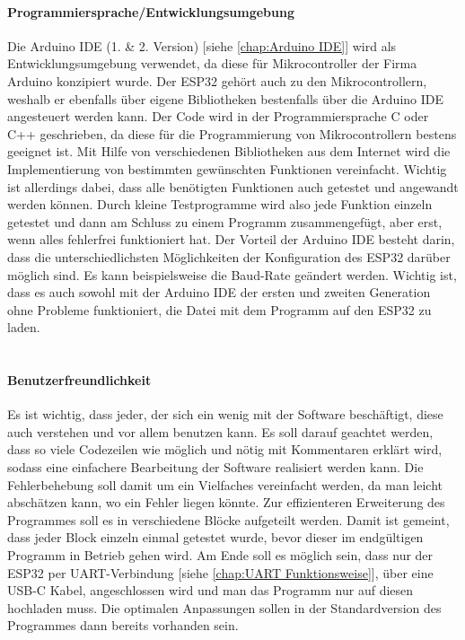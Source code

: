 \documentclass[titlepage,12pt,twoside]{article}
\begin{document}
\paragraph{Programmiersprache/Entwicklungsumgebung}
\hfill \break
\hfill \break
Die Arduino IDE (1. \& 2. Version) [siehe \textcolor{blue}{\autoref{chap:Arduino IDE}}] wird als Entwicklungsumgebung verwendet, da diese für Mikrocontroller der Firma Arduino 
konzipiert wurde. Der ESP32 gehört auch zu den Mikrocontrollern, weshalb er ebenfalls über eigene Bibliotheken bestenfalls 
über die Arduino IDE angesteuert werden kann. Der Code wird in der Programmiersprache C oder C++ geschrieben, da diese für 
die Programmierung von Mikrocontrollern bestens geeignet ist. Mit Hilfe von verschiedenen Bibliotheken aus dem Internet wird 
die Implementierung von bestimmten gewünschten Funktionen vereinfacht. Wichtig ist allerdings dabei, dass alle benötigten 
Funktionen auch getestet und angewandt werden können. Durch kleine Testprogramme wird also jede Funktion einzeln getestet und 
dann am Schluss zu einem Programm zusammengefügt, aber erst, wenn alles fehlerfrei funktioniert hat. Der Vorteil der Arduino 
IDE besteht darin, dass die unterschiedlichsten Möglichkeiten der Konfiguration des ESP32 darüber möglich sind. Es kann 
beispielsweise die Baud-Rate geändert werden. Wichtig ist, dass es auch sowohl mit der Arduino IDE der ersten und zweiten 
Generation ohne Probleme funktioniert, die Datei mit dem Programm auf den ESP32 zu laden. \\
\\
\paragraph{Benutzerfreundlichkeit}
\hfill \break
\hfill \break
Es ist wichtig, dass jeder, der sich ein wenig mit der Software beschäftigt, diese auch verstehen und vor allem benutzen kann. 
Es soll darauf geachtet werden, dass so viele Codezeilen wie möglich und nötig mit Kommentaren erklärt wird, sodass eine 
einfachere Bearbeitung der Software realisiert werden kann. Die Fehlerbehebung soll damit um ein Vielfaches vereinfacht werden, 
da man leicht abschätzen kann, wo ein Fehler liegen könnte. Zur effizienteren Erweiterung des Programmes soll es in 
verschiedene Blöcke aufgeteilt werden. Damit ist gemeint, dass jeder Block einzeln einmal getestet wurde, bevor dieser im 
endgültigen Programm in Betrieb gehen wird. Am Ende soll es möglich sein, dass nur der ESP32 per UART-Verbindung [siehe \textcolor{blue}{\autoref{chap:UART Funktionsweise}}], über eine 
USB-C Kabel, angeschlossen wird und man das Programm nur auf diesen hochladen muss. Die optimalen Anpassungen sollen in der 
Standardversion des Programmes dann bereits vorhanden sein. \\
\\
\end{document}
